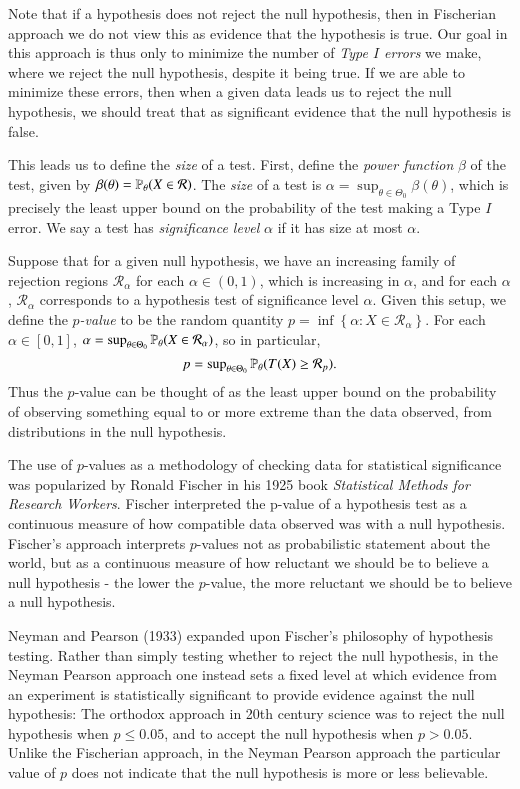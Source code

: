 Note that if a hypothesis does not reject the null hypothesis, then in Fischerian approach we do not view this as evidence that the hypothesis is true. Our goal in this approach is thus only to minimize the number of \emph{Type $I$ errors} we make, where we reject the null hypothesis, despite it being true. If we are able to minimize these errors, then when a given data leads us to reject the null hypothesis, we should treat that as significant evidence that the null hypothesis is false.

This leads us to define the \emph{size} of a test. First, define the \emph{power function} $\beta$ of the test, given by $\beta(\theta) = \operatorname{\mathbb{P}}_\theta(X \in \mathcal{R})$. The \emph{size} of a test is $\alpha = \sup_{\theta \in \Theta_0} \beta(\theta)$, which is precisely the least upper bound on the probability of the test making a Type $I$ error. We say a test has \emph{significance level} $\alpha$ if it has size at most $\alpha$.

Suppose that for a given null hypothesis, we have an increasing family of rejection regions $\mathcal{R}_\alpha$ for each $\alpha \in (0,1)$, which is increasing in $\alpha$, and for each $\alpha$, $\mathcal{R}_\alpha$ corresponds to a hypothesis test of significance level $\alpha$. Given this setup, we define the \emph{$p$-value} to be the random quantity $p = \inf \left\{ \alpha: X \in \mathcal{R}_\alpha \right\}$. For each $\alpha \in [0,1]$, $\alpha = \sup\nolimits_{\theta \in \Theta_0} \operatorname{\mathbb{P}}_\theta( X \in \mathcal{R}_\alpha )$, so in particular,
%
\[ p = \sup\nolimits_{\theta \in \Theta_0} \operatorname{\mathbb{P}}_\theta( T(X) \geq \mathcal{R}_p ). \]
%
Thus the $p$-value can be thought of as the least upper bound on the probability of observing something equal to or more extreme than the data observed, from distributions in the null hypothesis.

The use of $p$-values as a methodology of checking data for statistical significance was popularized by Ronald Fischer in his 1925 book \emph{Statistical Methods for Research Workers}. Fischer interpreted the p-value of a hypothesis test as a continuous measure of how compatible data observed was with a null hypothesis. Fischer's approach interprets $p$-values not as probabilistic statement about the world, but as a continuous measure of how reluctant we should be to believe a null hypothesis - the lower the $p$-value, the more reluctant we should be to believe a null hypothesis.

Neyman and Pearson (1933) expanded upon Fischer's philosophy of hypothesis testing. Rather than simply testing whether to reject the null hypothesis, in the Neyman Pearson approach one instead sets a fixed level at which evidence from an experiment is statistically significant to provide evidence against the null hypothesis: The orthodox approach in 20th century science was to reject the null hypothesis when $p \leq 0.05$, and to accept the null hypothesis when $p > 0.05$. Unlike the Fischerian approach, in the Neyman Pearson approach the particular value of $p$ does not indicate that the null hypothesis is more or less believable.

